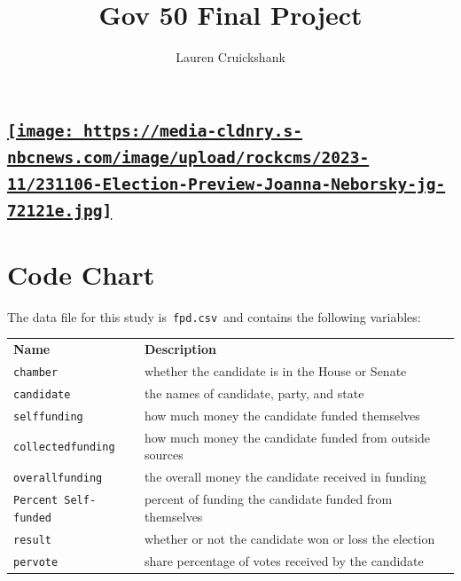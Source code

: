\documentclass[
]{article}
\title{Gov 50 Final Project}
\author{Lauren Cruickshank}
\date{}
\begin{document}
\maketitle

{
\setcounter{tocdepth}{2}
\tableofcontents
}
\hypertarget{clink-image-for-2024-election-predictions}{%
\subsection{\texorpdfstring{\href{https://www.270towin.com/maps/biden-trump-2024-map-based-on-polls}{\protect\texttt{[image: https://media-cldnry.s-nbcnews.com/image/upload/rockcms/2023-11/231106-Election-Preview-Joanna-Neborsky-jg-72121e.jpg]}}}{Clink Image for 2024 Election Predictions}}\label{clink-image-for-2024-election-predictions}}

\hypertarget{code-chart}{%
\section{Code Chart}\label{code-chart}}

The data file for this study is~\texttt{fpd.csv}~and contains the
following variables:

\begin{longtable}[]{@{}
  >{\raggedright\arraybackslash}p{}
  >{\raggedright\arraybackslash}p{}@{}}
\toprule\noalign{}
\endhead
\bottomrule\noalign{}
\endlastfoot
\textbf{Name} & \textbf{Description} \\
\texttt{chamber} & whether the candidate is in the House or Senate \\
\texttt{candidate} & the names of candidate, party, and state \\
\texttt{selffunding} & how much money the candidate funded themselves \\
\texttt{collectedfunding} & how much money the candidate funded from
outside sources \\
\texttt{overallfunding} & the overall money the candidate received in
funding \\
\texttt{Percent\ Self-funded} & percent of funding the candidate funded
from themselves \\
\texttt{result} & whether or not the candidate won or loss the
election \\
\texttt{pervote} & share percentage of votes received by the
candidate \\
\end{longtable}
\end{document}
